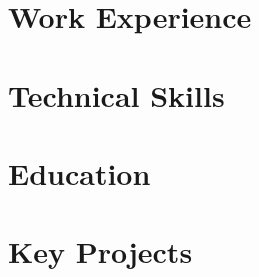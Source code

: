 \documentclass[a4paper, oneside, final]{scrartcl} %
\begin{document}
\begin{center} %


{\fontsize{28}{28}\selectfont\scshape\textls[200]{\MyName{}}} %

\vspace{0.8cm} %


\section{Work Experience}




\section{Technical Skills}




\section{Education}




\section{Key Projects}




\end{center}
\end{document}
